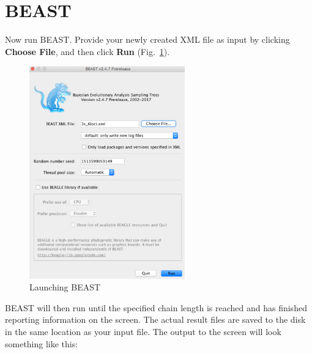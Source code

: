 \documentclass[11pt]{article}
\begin{document}
\section*{BEAST}

Now run BEAST. Provide your newly created XML file as input by clicking \textbf{Choose File}, and then click \textbf{Run} (Fig.~\ref{fig_beast}).

\begin{figure}[h]
\center
\includegraphics[width=0.6\textwidth]{figs/fig9_beast.png}
\caption{Launching BEAST}
\label{fig_beast}
\end{figure}

BEAST will then run until the specified chain length is reached and has finished reporting information on the screen. The actual result files are saved to the disk in the same location as your input file. The output to the screen will look something like this: 
\end{document}
